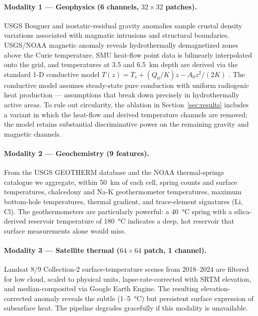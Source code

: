 \documentclass[review,12pt]{elsarticle}
\begin{document}
\paragraph{Modality 1 — Geophysics (6 channels, $32\times32$ patches).} USGS Bouguer and isostatic-residual gravity anomalies sample crustal density variations associated with magmatic intrusions and structural boundaries. USGS/NOAA magnetic anomaly reveals hydrothermally demagnetized zones above the Curie temperature. SMU heat-flow point data \citep{Blackwell2011} is bilinearly interpolated onto the grid, and temperatures at 3.5 and \SI{6.5}{\kilo\meter} depth are derived via the standard 1-D conductive model $T(z) = T_s + (Q_0/K)z - A_0z^2/(2K)$ \citep{BlackwellRichards2004}. The conductive model assumes steady-state pure conduction with uniform radiogenic heat production — assumptions that break down precisely in hydrothermally active areas. To rule out circularity, the ablation in Section~\ref{sec:results} includes a variant in which the heat-flow and derived temperature channels are removed; the model retains substantial discriminative power on the remaining gravity and magnetic channels.

\paragraph{Modality 2 — Geochemistry (9 features).} From the USGS GEOTHERM database and the NOAA thermal-springs catalogue we aggregate, within \SI{50}{\kilo\meter} of each cell, spring counts and surface temperatures, chalcedony \citep{Fournier1977} and Na-K \citep{Giggenbach1988} geothermometer temperatures, maximum bottom-hole temperatures, thermal gradient, and trace-element signatures (Li, Cl). The geothermometers are particularly powerful: a \SI{40}{\degreeCelsius} spring with a silica-derived reservoir temperature of \SI{180}{\degreeCelsius} indicates a deep, hot reservoir that surface measurements alone would miss.

\paragraph{Modality 3 — Satellite thermal ($64\times64$ patch, 1 channel).} Landsat 8/9 Collection-2 surface-temperature scenes from 2018–2024 are filtered for low cloud, scaled to physical units, lapse-rate-corrected with SRTM elevation, and median-composited via Google Earth Engine. The resulting elevation-corrected anomaly reveals the subtle (1–\SI{5}{\degreeCelsius}) but persistent surface expression of subsurface heat. The pipeline degrades gracefully if this modality is unavailable.
\end{document}

